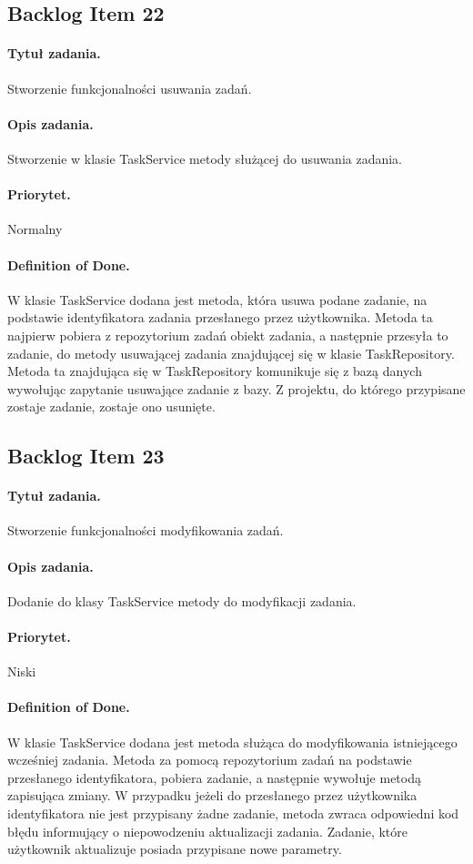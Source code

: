 \documentclass[a4paper]{article}
\begin{document}
\subsection{Backlog Item 22} 
\paragraph{Tytuł zadania.}  Stworzenie funkcjonalności usuwania zadań.
\paragraph{Opis zadania.} Stworzenie w klasie TaskService metody służącej do usuwania zadania. 
\paragraph{Priorytet.} Normalny
\paragraph{Definition of Done.} W klasie TaskService dodana jest metoda, która usuwa podane zadanie, na podstawie identyfikatora zadania przesłanego przez użytkownika. Metoda ta najpierw pobiera z repozytorium zadań obiekt zadania, a następnie przesyła to zadanie, do metody usuwającej zadania znajdującej się w klasie TaskRepository. Metoda ta znajdująca się w TaskRepository komunikuje się z bazą danych wywołując zapytanie usuwające zadanie z bazy. Z projektu, do którego przypisane zostaje zadanie, zostaje ono usunięte.

\subsection{Backlog Item 23} 
\paragraph{Tytuł zadania.} Stworzenie funkcjonalności modyfikowania zadań.
\paragraph{Opis zadania.} Dodanie do klasy TaskService metody do modyfikacji zadania.
\paragraph{Priorytet.} Niski
\paragraph{Definition of Done.} W klasie TaskService dodana jest metoda służąca do modyfikowania istniejącego wcześniej zadania. Metoda za pomocą repozytorium zadań na podstawie przesłanego identyfikatora, pobiera zadanie, a następnie wywołuje metodą zapisująca zmiany. W przypadku jeżeli do przesłanego przez użytkownika identyfikatora nie jest przypisany żadne zadanie, metoda zwraca odpowiedni kod błędu informujący o niepowodzeniu aktualizacji zadania. Zadanie, które użytkownik aktualizuje posiada przypisane nowe parametry.
\end{document}
